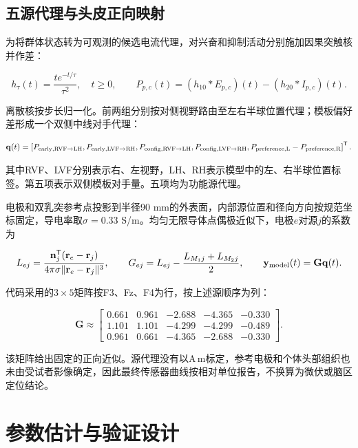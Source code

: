 \documentclass[12pt,a4paper]{article}
\begin{document}
\hypertarget{ux4e94ux6e90ux4ee3ux7406ux4e0eux5934ux76aeux6b63ux5411ux6620ux5c04}{%
\subsection{五源代理与头皮正向映射}\label{ux4e94ux6e90ux4ee3ux7406ux4e0eux5934ux76aeux6b63ux5411ux6620ux5c04}}

为将群体状态转为可观测的候选电流代理，对兴奋和抑制活动分别施加因果突触核并作差：

\[
h_\tau(t)=\frac{t e^{-t/\tau}}{\tau^2},\quad t\ge0,\qquad
P_{p,c}(t)=(h_{10}*E_{p,c})(t)-(h_{20}*I_{p,c})(t).
\]

离散核按步长归一化。前两组分别按对侧视野路由至左右半球位置代理；模板偏好差形成一个双侧中线对手代理：

\[
\mathbf q(t)=\left[
P_{\rm early,RVF\to LH},P_{\rm early,LVF\to RH},
P_{\rm config,RVF\to LH},P_{\rm config,LVF\to RH},
P_{\rm preference,L}-P_{\rm preference,R}
\right]^{\mathsf T}.
\]

其中RVF、LVF分别表示右、左视野，LH、RH表示模型中的左、右半球位置标签。第五项表示双侧模板对手量。五项均为功能源代理。

电极和双乳突参考点投影到半径90 mm的外表面，内部源位置和径向方向按规范坐标固定，导电率取\(\sigma=0.33\) S/m。均匀无限导体点偶极近似下，电极\(e\)对源\(j\)的系数为

\[
L_{ej}=\frac{\mathbf n_j^{\mathsf T}(\mathbf r_e-\mathbf r_j)}
{4\pi\sigma\lVert\mathbf r_e-\mathbf r_j\rVert^3},\qquad
G_{ej}=L_{ej}-\frac{L_{M_1j}+L_{M_2j}}{2},\qquad
\mathbf y_{\rm model}(t)=\mathbf G\mathbf q(t).
\]

代码采用的\(3\times5\)矩阵按F3、Fz、F4为行，按上述源顺序为列：

\[
\mathbf G\approx\begin{bmatrix}
0.661&0.961&-2.688&-4.365&-0.330\\
1.101&1.101&-4.299&-4.299&-0.489\\
0.961&0.661&-4.365&-2.688&-0.330
\end{bmatrix}.
\]

该矩阵给出固定的正向近似。源代理没有以\(\mathrm{A\,m}\)标定，参考电极和个体头部组织也未由受试者影像确定，因此最终传感器曲线按相对单位报告，不换算为微伏或脑区定位结论。

\hypertarget{ux53c2ux6570ux4f30ux8ba1ux4e0eux9a8cux8bc1ux8bbeux8ba1}{%
\section{参数估计与验证设计}\label{ux53c2ux6570ux4f30ux8ba1ux4e0eux9a8cux8bc1ux8bbeux8ba1}}
\end{document}
